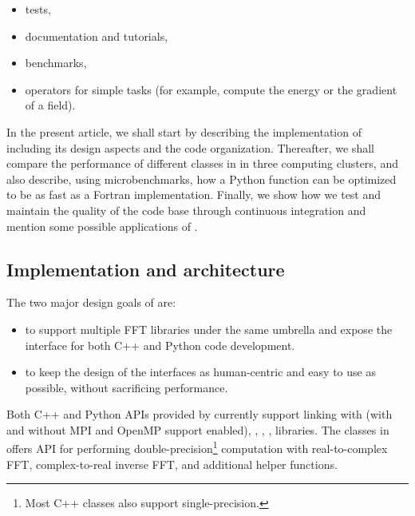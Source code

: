 \begin{itemize}
\item tests,

\item documentation and tutorials,

\item benchmarks,

\item operators for simple tasks (for example, compute the energy or the
gradient of a field).

\end{itemize}

In the present article, we shall start by describing the implementation of
 including its design aspects and the code organization. Thereafter,
we shall compare the performance of different classes in  in
three computing clusters, and also describe, using microbenchmarks, how a Python
function can be optimized to be as fast as a Fortran implementation. Finally,
we show how we test and maintain the quality of the code base through
continuous integration and mention some possible applications of
.

\subsection{Implementation and architecture}

The two major design goals of  are:
\begin{itemize}
 \item to support multiple FFT libraries under the same umbrella and expose the
 interface for both C++ and Python code development.
 \item to keep the design of the interfaces as human-centric and easy to use as
 possible, without sacrificing performance.
\end{itemize}

Both C++ and Python APIs provided by  currently support linking
with  (with and without MPI and OpenMP support enabled),
, , ,  libraries. The
classes in  offers API for performing
double-precision\footnote{Most C++ classes also support single-precision.}
computation with real-to-complex FFT, complex-to-real inverse FFT, and additional
helper functions.

